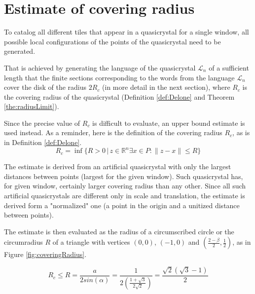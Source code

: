 \documentclass[text.tex]{subfiles}
\begin{document}
\section{Estimate of covering radius}
To catalog all different tiles that appear in a quasicrystal for a single window, all possible local configurations of the points of the quasicrystal need to be generated. 

That is achieved by generating the language of the quasicrystal $\mathcal{L}_n$ of a sufficient length that the finite sections corresponding to the words from the language $\mathcal{L}_n$ cover the disk of the radius $2R_c$ (in more detail in the next section), where $R_c$ is the covering radius of the quasicrystal (Definition \ref{def:Delone} and Theorem \ref{the:radiusLimit}).

Since the precise value of $R_c$ is difficult to evaluate, an upper bound estimate is used instead. As a reminder, here is the definition of the covering radius $R_c$, as is in Definition \ref{def:Delone}.
$$R_c = \inf\{R>0\,|\, z\in\mathbb{R}^n \exists x\in P: \|z-x\|\leq R\}$$

The estimate is derived from an artificial quasicrystal with only the largest distances between points (largest for the given window). Such quasicrystal has, for given window, certainly larger covering radius than any other. Since all such artificial quasicrystals are different only in scale and translation, the estimate is derived form a "normalized" one (a point in the origin and a unitized distance between points).

The estimate is then evaluated as the radius of a circumscribed circle or the circumradius $R$ of a triangle with vertices $(0,0)$, $(-1,0)$ and $\left(\frac{2-\beta}{2},\frac{1}{2}\right)$, as in Figure \ref{fig:coveringRadius}. 

$$R_c \leq R = \frac{a}{2sin(\alpha)} = \frac{1}{2\left(\frac{1+\sqrt{3}}{2\sqrt{2}}\right)} = \frac{\sqrt{2}(\sqrt{3}-1)}{2}$$
\end{document}
